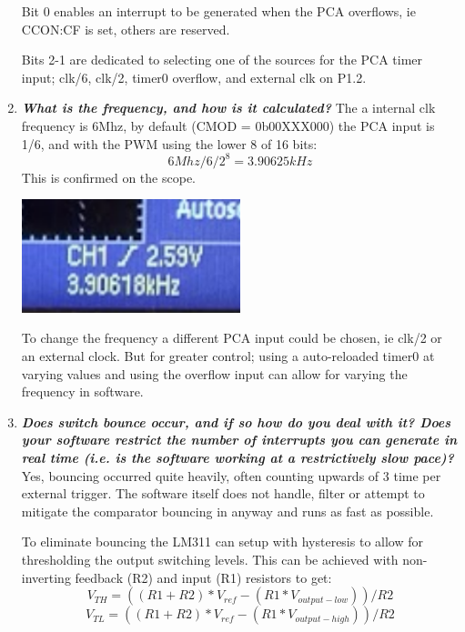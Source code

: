 \documentclass[11pt]{article}
\begin{document}
\begin{preview}
\begin{enumerate}
        Bit 0 enables an interrupt to be generated when the PCA overflows, ie CCON:CF is set, others are reserved.

        Bits 2-1 are dedicated to selecting one of the sources for the PCA timer input; clk/6, clk/2, timer0 overflow, and external clk on P1.2.
        \item \textit{\textbf{What is the frequency, and how is it calculated?}}
        The a internal clk frequency is 6Mhz, by default (CMOD = 0b00XXX000) the PCA input is 1/6, and with the PWM using the lower 8 of 16 bits:
        $$6Mhz/6/2^8 = 3.90625 kHz$$
        This is confirmed on the scope.
        \begin{center}
          \includegraphics[width=0.5\textwidth]{inc/freq.png}
        \end{center}

        To change the frequency a different PCA input could be chosen, ie clk/2 or an external clock. But for greater control; using a auto-reloaded timer0 at varying values and using the overflow input can allow for varying the frequency in software.
        \item \textit{\textbf{Does switch bounce occur, and if so how do you deal with it?  Does your software restrict the number of interrupts you can generate in real time (i.e. is the software working at a restrictively slow pace)?}}\\
        Yes, bouncing occurred quite heavily, often counting upwards of 3 time per external trigger. The software itself does not handle, filter or attempt to mitigate the comparator bouncing in anyway and runs as fast as possible.

        To eliminate bouncing the LM311 can setup with hysteresis to allow for thresholding the output switching levels. This can be achieved with non-inverting feedback (R2) and input (R1) resistors to get:
        $$V_{TH} = ((R1+R2)*V_{ref}-(R1*V_{output-low}))/R2$$  
        $$V_{TL} = ((R1+R2)*V_{ref}-(R1*V_{output-high}))/R2$$  
        \label{bounce}
\end{enumerate}

\end{preview}
\end{document}
